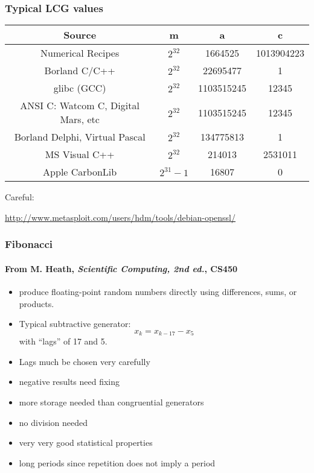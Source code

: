 \documentclass[10pt]{beamer}
\begin{document}
\begin{frame}
\frametitle{Typical LCG values}
\begin{tabular}{c | c c c}\hline
Source                                                                            &  m  &  a  &  c \\\hline
Numerical Recipes                                                                 &  $2^{32}$  &  1664525  &  1013904223 \\
Borland C/C++                                                                     &  $2^{32}$  &  22695477  &  1 \\
glibc (GCC)                                                                       &  $2^{32}$  &  1103515245  &  12345\\
ANSI C: Watcom C, Digital Mars, etc                 &  $2^{32}$  &  1103515245  &  12345\\
Borland Delphi, Virtual Pascal                                                    &  $2^{32}$  &  134775813  &  1\\
MS Visual C++                                           &  $2^{32}$  &  214013  &  2531011\\
Apple CarbonLib                                                         &  $2^{31} - 1$ &  16807  &  0\\\hline
\end{tabular}
\bigskip

Careful:

\url{http://www.metasploit.com/users/hdm/tools/debian-openssl/}

\end{frame}
\begin{frame}
\frametitle{Fibonacci}
\framesubtitle{From M. Heath, \emph{Scientific Computing, 2nd ed.}, CS450}
\begin{itemize}
    \item produce floating-point random numbers directly using differences,
sums, or products.
    \item Typical subtractive generator:
\[
x_k = x_{k-17} - x_{5}
\]
with ``lags'' of 17 and 5.
    \item Lags much be chosen very carefully
    \item negative results need fixing
    \item more storage needed than congruential generators
    \item no division needed
    \item very very good statistical properties
    \item long periods since repetition does not imply a period
\end{itemize}
\end{frame}
\end{document}
